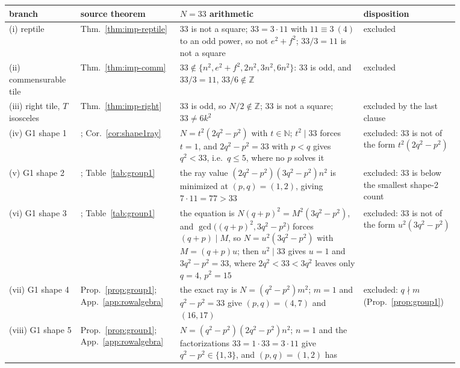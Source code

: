\documentclass[11pt]{amsart}
\theoremstyle{definition}
\theoremstyle{remark}
\newcommand{\Z}{\mathbb Z}
\newcommand{\N}{\mathbb N}
\begin{document}
\begin{table}[ht]
\centering
\small
\renewcommand{\arraystretch}{1.15}
\begin{tabular}{@{}>{\raggedright\arraybackslash}p{0.145\linewidth}
>{\raggedright\arraybackslash}p{0.185\linewidth}
>{\raggedright\arraybackslash}p{0.375\linewidth}
>{\raggedright\arraybackslash}p{0.165\linewidth}@{}}
\toprule
branch & source theorem & $N=33$ arithmetic & disposition \\
\midrule
(i) reptile
 & Thm.~\ref{thm:imp-reptile}
 & $33$ is not a square; $33=3\cdot11$ with $11\equiv3\ (4)$ to an odd
   power, so not $e^2+f^2$; $33/3=11$ is not a square
 & excluded \\
(ii) commensurable tile
 & Thm.~\ref{thm:imp-comm}
 & $33\notin\{n^2,e^2+f^2,2n^2,3n^2,6n^2\}$: $33$ is odd, and
   $33/3=11$, $33/6\notin\Z$
 & excluded \\
(iii) right tile, $T$ isosceles
 & Thm.~\ref{thm:imp-right}
 & $33$ is odd, so $N/2\notin\Z$; $33$ is not a square; $33\ne6k^2$
 & excluded by the last clause \\
(iv) G1 shape 1
 & {\cite[Thm.~4]{Beeson2229}}; Cor.~\ref{cor:shape1ray}
 & $N=t^2(2q^2-p^2)$ with $t\in\N$; $t^2\mid33$ forces $t=1$, and
   $2q^2-p^2=33$ with $p<q$ gives $q^2<33$, i.e.\ $q\le5$, where no $p$
   solves it
 & excluded: $33$ is not of the form $t^2(2q^2-p^2)$ \\
(v) G1 shape 2
 & {\cite[Thm.~9, Table~2]{Beeson2229}}; Table~\ref{tab:group1}
 & the ray value $(2q^2-p^2)(3q^2-p^2)n^2$ is minimized at $(p,q)=(1,2)$,
   giving $7\cdot11=77>33$
 & excluded: $33$ is below the smallest shape-2 count \\
(vi) G1 shape 3
 & {\cite[Thm.~14, Cor.~2]{Beeson2229}}; Table~\ref{tab:group1}
 & the equation is $N(q+p)^2=M^2(3q^2-p^2)$, and
   $\gcd\bigl((q+p)^2,3q^2-p^2\bigr)$ forces $(q+p)\mid M$, so
   $N=u^2(3q^2-p^2)$ with $M=(q+p)u$; then $u^2\mid33$ gives $u=1$ and
   $3q^2-p^2=33$, where $2q^2<33<3q^2$ leaves only $q=4$, $p^2=15$
 & excluded: $33$ is not of the form $u^2(3q^2-p^2)$ \\
(vii) G1 shape 4
 & Prop.~\ref{prop:group1}; App.~\ref{app:rowalgebra}
 & the exact ray is $N=(q^2-p^2)m^2$; $m=1$ and $q^2-p^2=33$ give
   $(p,q)=(4,7)$ and $(16,17)$
 & excluded: $q\nmid m$ (Prop.~\ref{prop:group1}) \\
(viii) G1 shape 5
 & Prop.~\ref{prop:group1}; App.~\ref{app:rowalgebra}
 & $N=(q^2-p^2)(2q^2-p^2)n^2$; $n=1$ and the factorizations $33=1\cdot33
   =3\cdot11$ give $q^2-p^2\in\{1,3\}$, and $(p,q)=(1,2)$ has

\end{tabular}
\end{table}
\end{document}
